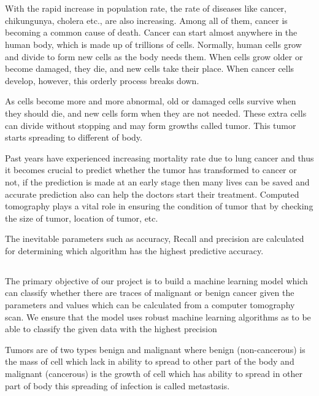\documentclass[12pt]{article}
\newcommand{\mainsize}{\fontsize{16pt}{12pt}\selectfont}
\newcommand{\msize}{\fontsize{14pt}{12pt}\selectfont}
\begin{document}
\large  
\parskip 3mm 
\tableofcontents
\newpage 
\listoffigures
\newpage
\section{\mainsize{\textbf{INTRODUCTION}}}
With the rapid increase in population rate, the rate of diseases like cancer, chikungunya, cholera etc., are also increasing. Among all of them, cancer is becoming a common cause of death. Cancer can start almost anywhere in the human body, which is made up of trillions of cells. Normally, human cells grow and divide to form new cells as the body needs them. When cells grow older or become damaged, they die, and new cells take their place. When cancer cells develop, however, this orderly process breaks down.

As cells become more and more abnormal, old or damaged cells survive when they should die, and new cells form when they are not needed. These extra cells can divide without stopping and may form growths called tumor. This tumor starts spreading to different of body.

Past years have experienced increasing mortality rate due to lung cancer and thus it becomes crucial to predict whether the tumor has transformed to cancer or not, if the prediction is made at an early stage then many lives can be saved and accurate prediction also can help the doctors start their treatment. Computed tomography plays a vital role in ensuring the condition of tumor that by checking the size of tumor, location of tumor, etc. 

The inevitable parameters such as accuracy, Recall and precision are calculated for determining which algorithm has the highest predictive accuracy.
\newpage 
\subsection{\msize{\textbf{PRIMARY OBJECTIVE}}}
The primary objective of our project is to build a machine learning model which can classify whether there are traces of malignant or benign cancer given the parameters and values which can be calculated from a computer tomography scan. We ensure that the model uses robust machine learning algorithms as to be able to classify the given data with the highest precision 

Tumors are of two types benign and malignant where benign (non-cancerous) is the mass of cell which lack in ability to spread to other part of the body and malignant (cancerous) is the growth of cell which has ability to spread in other part of body this spreading of infection is called metastasis.
\end{document}
